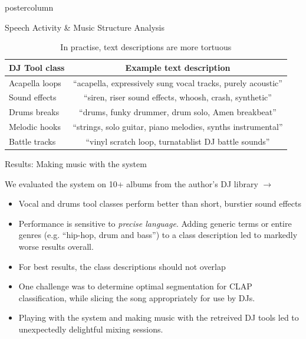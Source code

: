 \documentclass{beamer}
\begin{document}
\begin{frame}
\begin{columns}
\begin{column}{.57\textwidth}
\begin{beamercolorbox}[center]{postercolumn}
\begin{minipage}{.98\textwidth}
{\begin{myblock}{Speech Activity \& Music Structure Analysis}
			
			\begin{table}
			 \begin{center}
			 \begin{tabular}{lc}
			  \midrule
			  \textbf{DJ Tool class} & \textbf{Example text description} \\
			  \midrule
				Acapella loops & ``acapella, expressively sung vocal tracks, purely acoustic''  \\
				Sound effects &  ``siren, riser sound effects, whoosh, crash, synthetic''\\
				Drums breaks  & ``drums, funky drummer, drum solo, Amen breakbeat''  \\
				Melodic hooks & ``strings, solo guitar, piano melodies, synths instrumental''  \\
				Battle tracks & ``vinyl scratch loop, turnatablist DJ battle sounds''   \\
			 \end{tabular}
			\end{center}
			 \caption{In practise, text descriptions are more tortuous}
			 \label{tab:djtool_texts}
			\end{table}
			
		\end{myblock}\vfill
					
					
					\begin{myblock}{Results: Making music with the system}

					We evaluated the system on 10+ albums from the author's DJ library $\rightarrow$ 

						\begin{itemize}
							\item Vocal and drums tool classes perform better than short, burstier sound effects 							
							\item Performance is sensitive to \textit{precise language}. Adding generic terms or entire genres (e.g. ``hip-hop, drum and bass'') to a class description led to markedly worse results overall.
							\item For best results, the class descriptions should not overlap
							\item One challenge was to determine optimal segmentation for CLAP classification, while slicing the song appropriately for use by DJs.
							\item Playing with the system and making music with the retreived DJ tools led to unexpectedly delightful mixing sessions.
						\end{itemize}
	\end{myblock}\vfill
					
}
\end{minipage}
\end{beamercolorbox}
\end{column}
\end{columns}
\end{frame}
\end{document}
